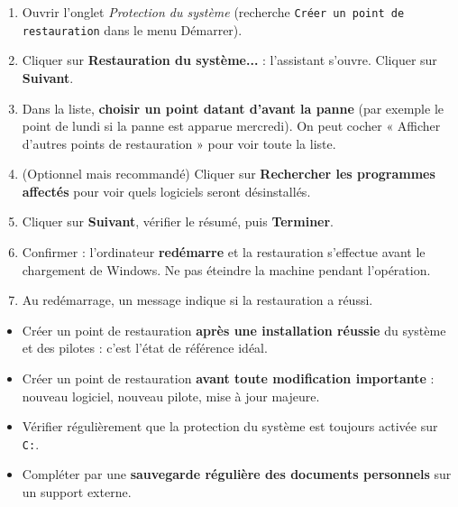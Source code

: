 \documentclass[11pt]{article}
\begin{document}
\begin{methode}
\begin{enumerate}
\item Ouvrir l'onglet \emph{Protection du système} (recherche \texttt{Créer un point de restauration} dans le menu Démarrer).
\item Cliquer sur \textbf{Restauration du système...} : l'assistant s'ouvre. Cliquer sur \textbf{Suivant}.
\item Dans la liste, \textbf{choisir un point datant d'avant la panne} (par exemple le point de lundi si la panne est apparue mercredi). On peut cocher « Afficher d'autres points de restauration » pour voir toute la liste.
\item (Optionnel mais recommandé) Cliquer sur \textbf{Rechercher les programmes affectés} pour voir quels logiciels seront désinstallés.
\item Cliquer sur \textbf{Suivant}, vérifier le résumé, puis \textbf{Terminer}.
\item Confirmer : l'ordinateur \textbf{redémarre} et la restauration s'effectue avant le chargement de Windows. Ne pas éteindre la machine pendant l'opération.
\item Au redémarrage, un message indique si la restauration a réussi.
\end{enumerate}
\end{methode}

\begin{aretenir}
\begin{itemize}
\item Créer un point de restauration \textbf{après une installation réussie} du système et des pilotes : c'est l'état de référence idéal.
\item Créer un point de restauration \textbf{avant toute modification importante} : nouveau logiciel, nouveau pilote, mise à jour majeure.
\item Vérifier régulièrement que la protection du système est toujours activée sur \texttt{C:}.
\item Compléter par une \textbf{sauvegarde régulière des documents personnels} sur un support externe.
\end{itemize}
\end{aretenir}
\end{document}
